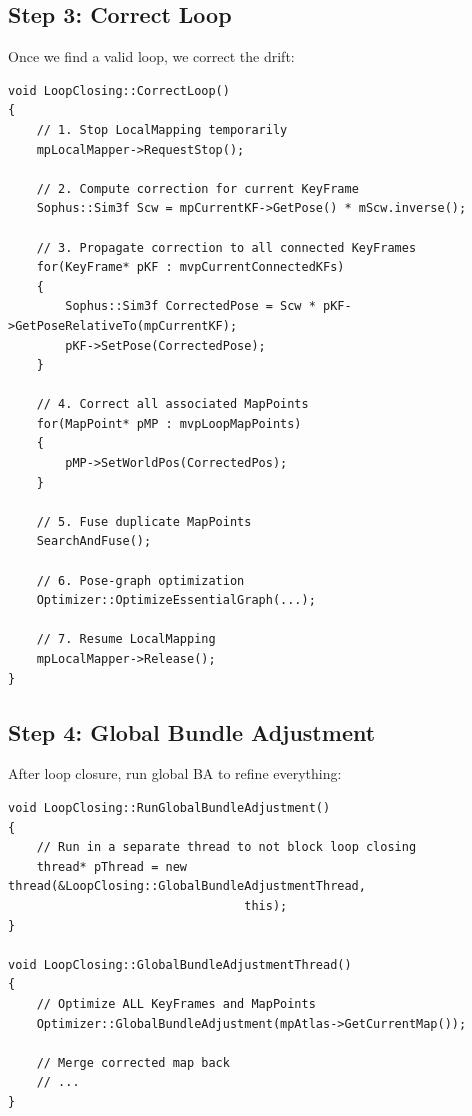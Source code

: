 \subsection{Step 3: Correct Loop}

Once we find a valid loop, we correct the drift:

\begin{lstlisting}[caption={CorrectLoop concept}]
void LoopClosing::CorrectLoop()
{
    // 1. Stop LocalMapping temporarily
    mpLocalMapper->RequestStop();
    
    // 2. Compute correction for current KeyFrame
    Sophus::Sim3f Scw = mpCurrentKF->GetPose() * mScw.inverse();
    
    // 3. Propagate correction to all connected KeyFrames
    for(KeyFrame* pKF : mvpCurrentConnectedKFs)
    {
        Sophus::Sim3f CorrectedPose = Scw * pKF->GetPoseRelativeTo(mpCurrentKF);
        pKF->SetPose(CorrectedPose);
    }
    
    // 4. Correct all associated MapPoints
    for(MapPoint* pMP : mvpLoopMapPoints)
    {
        pMP->SetWorldPos(CorrectedPos);
    }
    
    // 5. Fuse duplicate MapPoints
    SearchAndFuse();
    
    // 6. Pose-graph optimization
    Optimizer::OptimizeEssentialGraph(...);
    
    // 7. Resume LocalMapping
    mpLocalMapper->Release();
}
\end{lstlisting}

\subsection{Step 4: Global Bundle Adjustment}

After loop closure, run global BA to refine everything:

\begin{lstlisting}[caption={Global BA}]
void LoopClosing::RunGlobalBundleAdjustment()
{
    // Run in a separate thread to not block loop closing
    thread* pThread = new thread(&LoopClosing::GlobalBundleAdjustmentThread, 
                                 this);
}

void LoopClosing::GlobalBundleAdjustmentThread()
{
    // Optimize ALL KeyFrames and MapPoints
    Optimizer::GlobalBundleAdjustment(mpAtlas->GetCurrentMap());
    
    // Merge corrected map back
    // ...
}
\end{lstlisting}

